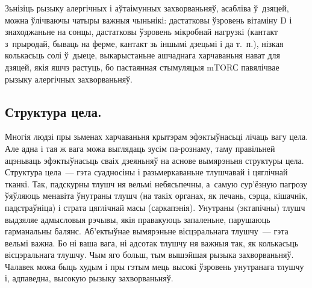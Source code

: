 Зьнізіць рызыку алергічных і аўтаімунных захворваньняў, асабліва ў~дзяцей, можна ўлічваючы чатыры важныя чыньнікі: дастатковы ўзровень вітаміну D і знаходжаньне на сонцы, дастатковы ўзровень мікробнай нагрузкі (кантакт з~прыродай, бываць на ферме, кантакт зь іншымі дзецьмі і да т.~п.), нізкая колькасьць солі ў~дыеце, выкарыстаньне ашчаднага харчаваньня нават для дзяцей, якія яшчэ растуць, бо пастаянная стымуляцыя mTORС павялічвае рызыку алергічных захворваньняў.

\subsection{Структура цела.}
Многія людзі пры зьменах харчаваньня крытэрам эфэктыўнасьці лічаць вагу цела. Але адна і тая ж вага можа выглядаць зусім па-рознаму, таму правільней ацэньваць эфэктыўнасьць сваіх дзеяньняў на аснове вымярэньня структуры цела. Структура цела~--- гэта суадносіны і разьмеркаваньне тлушчавай і цяглічнай тканкі. Так, падскурны тлушч ня вельмі небясьпечны, а~самую сур'ёзную пагрозу ўяўляюць менавіта ўнутраны тлушч (на такіх органах, як печань, сэрца, кішачнік, падстраўніца) і страта цяглічнай масы (саркапэнія). Унутраны (эктапічны) тлушч выдзяляе адмысловыя рэчывы, якія правакуюць запаленьне, парушаюць гарманальны балянс. Аб'ектыўнае вымярэньне вісцэральнага тлушчу~--- гэта вельмі важна. Бо ні ваша вага, ні адсотак тлушчу ня важныя так, як колькасьць вісцэральнага тлушчу. Чым яго больш, тым вышэйшая рызыка захворваньняў. Чалавек можа быць худым і пры гэтым мець высокі ўзровень унутранага тлушчу і, адпаведна, высокую рызыку захворваньняў.


